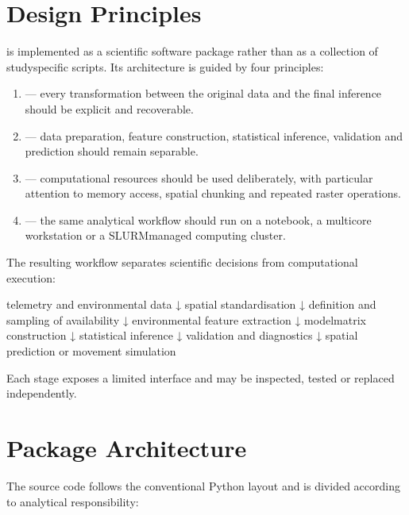 \documentclass[letterpaper,10pt,english]{sphinxmanual}
\begin{document}
\section{Design Principles}
\label{\detokenize{implementation:design-principles}}
\sphinxAtStartPar
{} is implemented as a scientific software package rather than as a collection of study\sphinxhyphen{}specific scripts. Its architecture is guided by four principles:
\begin{enumerate}
%
\item {} 
\sphinxAtStartPar
{} — every transformation between the original data and the final inference should be explicit and recoverable.

\item {} 
\sphinxAtStartPar
{} — data preparation, feature construction, statistical inference, validation and prediction should remain separable.

\item {} 
\sphinxAtStartPar
{} — computational resources should be used deliberately, with particular attention to memory access, spatial chunking and repeated raster operations.

\item {} 
\sphinxAtStartPar
{} — the same analytical workflow should run on a notebook, a multicore workstation or a SLURM\sphinxhyphen{}managed computing cluster.

\end{enumerate}

\sphinxAtStartPar
The resulting workflow separates scientific decisions from computational execution:

\begin{sphinxVerbatim}[commandchars=\\\{\}]
telemetry and environmental data
        ↓
spatial standardisation
        ↓
definition and sampling of availability
        ↓
environmental feature extraction
        ↓
model\PYGZhy{}matrix construction
        ↓
statistical inference
        ↓
validation and diagnostics
        ↓
spatial prediction or movement simulation
\end{sphinxVerbatim}

\sphinxAtStartPar
Each stage exposes a limited interface and may be inspected, tested or replaced independently.


\section{Package Architecture}
\label{\detokenize{implementation:package-architecture}}
\sphinxAtStartPar
The source code follows the conventional Python  layout and is divided according to analytical responsibility:
\end{document}
